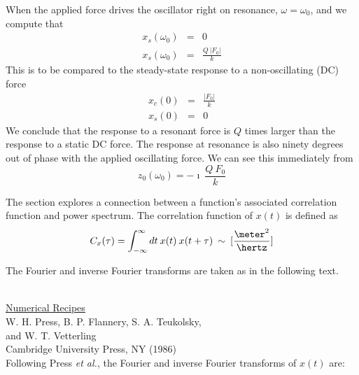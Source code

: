 When the applied force drives the oscillator right on resonance,
$\omega = \omega_0$, and we compute that
\begin{eqnarray}
x_s(\omega_0) & = & 0 \\
x_s(\omega_0) & = & \frac{Q \: | F_0 |}{k}
\end{eqnarray}
This is to be compared to the steady-state response to a
non-oscillating (DC) force
\begin{eqnarray}
x_c(0) & = & \frac{| F_0 |}{k} \\
x_s(0) & = & 0
\end{eqnarray}
We conclude that the response to a resonant force is $Q$ times larger
than the response to a static DC force.  The response at resonance is
also ninety degrees out of phase with the applied oscillating force.
We can see this immediately from
\begin{equation}
z_0(\omega_0) = - \imath \: \frac{Q \: F_0}{k}
\end{equation}



\label{sect:correlation-functions-I}

The section explores a connection between a function's associated
correlation function and power spectrum.  The correlation function of
$x(t)$ is defined as
\begin{equation}
C_x(\tau) = \int_{-\infty}^{\infty} dt \: x(t) \: x(t+\tau) \: \sim \: [\frac{\meter^2}{\hertz}]
\end{equation}

The Fourier and inverse Fourier transforms are taken
as in the following text.

\indent \\
\indent \underline{Numerical Recipes} \\
\indent W. H.  Press, B. P. Flannery, S. A. Teukolsky, \\
\indent and W. T. Vetterling \\
\indent Cambridge University Press, NY (1986) \\

Following Press \emph{et al.}, the Fourier and inverse Fourier
transforms of $x(t)$ are:

